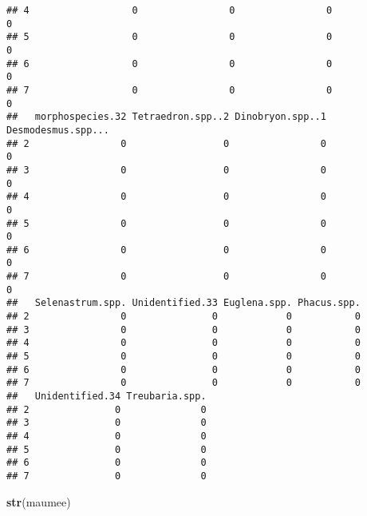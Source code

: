 \documentclass[]{article}
\newenvironment{Shaded}{\begin{snugshade}}{\end{snugshade}}
\newcommand{\KeywordTok}[1]{\textcolor[rgb]{0.13,0.29,0.53}{\textbf{#1}}}
\newcommand{\NormalTok}[1]{#1}
\begin{document}
\begin{verbatim}
## 4                  0                0                0                  0
## 5                  0                0                0                  0
## 6                  0                0                0                  0
## 7                  0                0                0                  0
##   morphospecies.32 Tetraedron.spp..2 Dinobryon.spp..1 Desmodesmus.spp...
## 2                0                 0                0                  0
## 3                0                 0                0                  0
## 4                0                 0                0                  0
## 5                0                 0                0                  0
## 6                0                 0                0                  0
## 7                0                 0                0                  0
##   Selenastrum.spp. Unidentified.33 Euglena.spp. Phacus.spp.
## 2                0               0            0           0
## 3                0               0            0           0
## 4                0               0            0           0
## 5                0               0            0           0
## 6                0               0            0           0
## 7                0               0            0           0
##   Unidentified.34 Treubaria.spp.
## 2               0              0
## 3               0              0
## 4               0              0
## 5               0              0
## 6               0              0
## 7               0              0
\end{verbatim}

\begin{Shaded}
\begin{Highlighting}[]
\KeywordTok{str}\NormalTok{(maumee)}
\end{Highlighting}
\end{Shaded}
\end{document}
